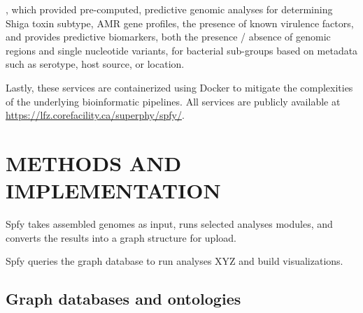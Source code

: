 \documentclass[a4,center,fleqn]{NAR}
\begin{document}
, which provided pre-computed, predictive genomic analyses for determining Shiga toxin subtype, AMR gene profiles, the presence of known virulence factors, and provides predictive biomarkers, both the presence / absence of genomic regions and single nucleotide variants, for bacterial sub-groups based on metadata such as serotype, host source, or location.




Lastly, these services are containerized using Docker to mitigate the complexities of the underlying bioinformatic pipelines.
All services are publicly available at \url{https://lfz.corefacility.ca/superphy/spfy/}.

\enlargethispage{-65.1pt}

\section{METHODS AND IMPLEMENTATION}

Spfy takes assembled genomes as input, runs selected analyses modules, and converts the results into a graph structure for upload.

Spfy queries the graph database to run analyses XYZ and build visualizations.

\subsection{Graph databases and ontologies}
\end{document}
